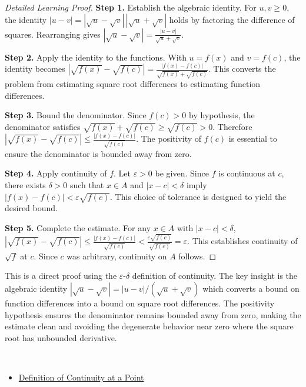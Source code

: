 \begin{proof}[Detailed Learning Proof]
\LRAProofBodyStart

\textbf{Step 1.} Establish the algebraic identity. For $u, v \geq 0$, the identity $|u - v| = |\sqrt{u} - \sqrt{v}|\,|\sqrt{u} + \sqrt{v}|$ holds by factoring the difference of squares. Rearranging gives $|\sqrt{u} - \sqrt{v}| = \frac{|u - v|}{\sqrt{u} + \sqrt{v}}$.

\textbf{Step 2.} Apply the identity to the functions. With $u = f(x)$ and $v = f(c)$, the identity becomes $|\sqrt{f(x)} - \sqrt{f(c)}| = \frac{|f(x) - f(c)|}{\sqrt{f(x)} + \sqrt{f(c)}}$. This converts the problem from estimating square root differences to estimating function differences.

\textbf{Step 3.} Bound the denominator. Since $f(c) > 0$ by hypothesis, the denominator satisfies $\sqrt{f(x)} + \sqrt{f(c)} \geq \sqrt{f(c)} > 0$. Therefore $|\sqrt{f(x)} - \sqrt{f(c)}| \leq \frac{|f(x) - f(c)|}{\sqrt{f(c)}}$. The positivity of $f(c)$ is essential to ensure the denominator is bounded away from zero.

\textbf{Step 4.} Apply continuity of $f$. Let $\varepsilon > 0$ be given. Since $f$ is continuous at $c$, there exists $\delta > 0$ such that $x \in A$ and $|x - c| < \delta$ imply $|f(x) - f(c)| < \varepsilon\sqrt{f(c)}$. This choice of tolerance is designed to yield the desired bound.

\textbf{Step 5.} Complete the estimate. For any $x \in A$ with $|x - c| < \delta$, $|\sqrt{f(x)} - \sqrt{f(c)}| \leq \frac{|f(x) - f(c)|}{\sqrt{f(c)}} < \frac{\varepsilon\sqrt{f(c)}}{\sqrt{f(c)}} = \varepsilon$. This establishes continuity of $\sqrt{f}$ at $c$. Since $c$ was arbitrary, continuity on $A$ follows.
\end{proof}

\begin{remark*}
This is a direct proof using the $\varepsilon$-$\delta$ definition of continuity. The key insight is the algebraic identity $|\sqrt{u} - \sqrt{v}| = |u-v|/(\sqrt{u}+\sqrt{v})$ which converts a bound on function differences into a bound on square root differences. The positivity hypothesis ensures the denominator remains bounded away from zero, making the estimate clean and avoiding the degenerate behavior near zero where the square root has unbounded derivative.
\end{remark*}

\begin{remark*}[Dependencies]~\\
\begin{itemize}
  \item \hyperref[def:continuous-at-point]{Definition of Continuity at a Point}
\end{itemize}
\end{remark*}
